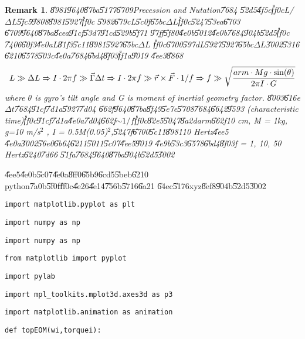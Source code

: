 \documentclass[12pt]{article}
\newtheorem{remark}[theorem]{Remark}
\begin{document}
\begin{remark}
\U{8981}\U{9640}\U{87ba}\U{5177}\U{6709}Precession and Nutation\U{7684}%
\U{52d5}\U{4f5c}\U{ff0c}L/$\Delta L$\U{5fc5}\U{9808}\U{8981}\U{5927}\U{ff0c}%
\U{5982}\U{679c}L\U{5c0f}\U{65bc}$\Delta L$\U{ff0c}\U{5247}\U{53ea}\U{6703}%
\U{6709}\U{9640}\U{87ba}\U{8cea}\U{91cf}\U{53d7}\U{91cd}\U{529b}\U{5f71}%
\U{97ff}\U{5f80}\U{4e0b}\U{5012}\U{4e0b}\U{7684}\U{904b}\U{52d5}\U{ff0c}%
\U{7406}\U{60f3}\U{4e0a}L\U{81f3}\U{5c11}\U{8981}\U{5927}\U{65bc}$\Delta L$%
\U{ff0c}\U{6700}\U{597d}L\U{5927}\U{5927}\U{65bc}$\Delta L$\U{3002}\U{5316}%
\U{6210}\U{6578}\U{503c}\U{4e0a}\U{7684}\U{6bd4}\U{8f03}\U{ff1a}\U{9019}%
\U{4ee3}\U{8868}%
\begin{equation}
L\gg \Delta L\Rightarrow I\cdot 2\pi f\gg \vec{\Gamma}\Delta t\Rightarrow
I\cdot 2\pi f\gg \vec{r}\times \vec{F}\cdot 1/f\Rightarrow f\gg \sqrt{\frac{%
arm\cdot Mg\cdot \sin (\theta )}{2\pi I\cdot G}}
\end{equation}%
where $\theta $ is gyro's tilt angle and G is moment of inertial geometry
factor. \U{8003}\U{616e}$\Delta t$\U{7684}\U{91cf}\U{7d1a}\U{5927}\U{7d04}%
\U{662f}\U{9640}\U{87ba}\U{8f49}\U{5e7e}\U{5708}\U{7684}\U{6642}\U{9593}%
(characteristic time)\U{ff0c}\U{91cf}\U{7d1a}\U{4e0a}\U{7d04}\U{662f}$\sim
1/f$\U{ff0c}\U{82e5}\U{5047}\U{8a2d}arm\U{662f}10 cm, M = 1kg, g=10 m/s$^{2}$%
, I = 0.5M(0.05)$^{2}$,\U{5247}f\U{6700}\U{5c11}\U{8981}10 Hertz\U{4ee5}%
\U{4e0a}\U{3002}\U{56e0}\U{6b64}\U{6211}\U{5011}\U{5c07}\U{4ee5}\U{9019}%
\U{4e9b}\U{53c3}\U{6578}\U{6bd4}\U{8f03}f = 1, 10, 50 Hertz\U{6240}\U{7d66}%
\U{51fa}\U{7684}\U{9640}\U{87ba}\U{904b}\U{52d5}\U{3002}\bigskip 
\end{remark}

\U{4ee5}\U{4e0b}\U{5c07}\U{4e0a}\U{8ff0}\U{65b9}\U{6cd5}\U{5beb}\U{6210}%
python\U{7a0b}\U{5f0f}\U{ff0c}\U{4e26}\U{4e14}\U{756b}\U{5716}\U{6a21}%
\U{64ec}\U{5176}xyz\U{8ef8}\U{904b}\U{52d5}\U{3002}

\texttt{import matplotlib.pyplot as plt}

\texttt{import numpy as np}

\texttt{import numpy as np}

\texttt{from matplotlib import pyplot}

\texttt{import pylab}

\texttt{import mpl\_toolkits.mplot3d.axes3d as p3}

\texttt{import matplotlib.animation as animation}

\texttt{def topEOM(wi,torquei):}
\end{document}
